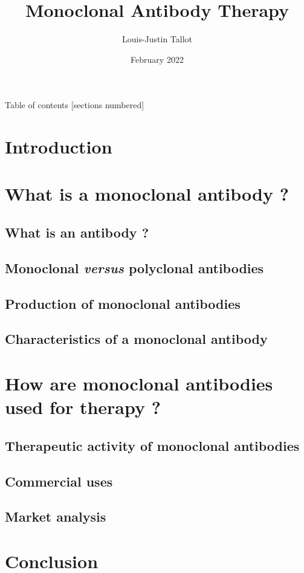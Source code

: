 \documentclass{beamer}
\title{
  \textbf{Monoclonal Antibody Therapy}
}
\author{Louis-Justin Tallot}
\date{February 2022}
\begin{document}
  \maketitle

  \begin{frame}{Table of contents}
    [sections numbered]
    \tableofcontents
  \end{frame}



  \section*{Introduction}
  

  \section{What is a monoclonal antibody ?}

    \subsection{What is an antibody ?}
    

    \subsection{Monoclonal \textit{versus} polyclonal antibodies}
    

    \subsection{Production of monoclonal antibodies}
    

    \subsection{Characteristics of a monoclonal antibody}
    

  \section{How are monoclonal antibodies used for therapy ?}

    \subsection{Therapeutic activity of monoclonal antibodies}
    

    \subsection{Commercial uses}
    

    \subsection{Market analysis}
  
  
  \section*{Conclusion}
\end{document}
